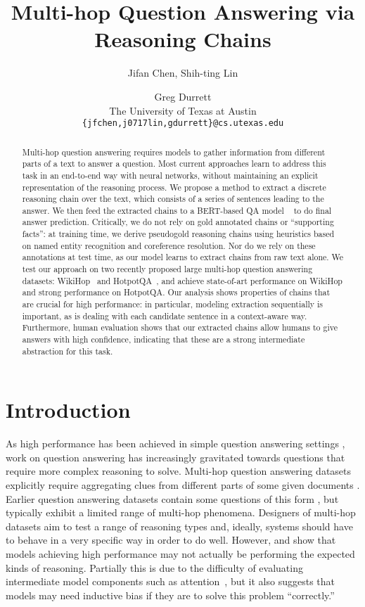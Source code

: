 \documentclass[11pt,a4paper]{article}
\title{Multi-hop Question Answering via \\  Reasoning Chains}
\author{Jifan Chen, Shih-ting Lin \and Greg Durrett \\
  The University of Texas at Austin \\
  {\tt \{jfchen,j0717lin,gdurrett\}@cs.utexas.edu}}
\date{}
\begin{document}
\maketitle
\begin{abstract}
Multi-hop question answering requires models to gather information from different parts of a text to answer a question. Most current approaches learn to address this task in an end-to-end way with neural networks, without maintaining an explicit representation of the reasoning process. We propose a method to extract a discrete reasoning chain over the text, which consists of a series of sentences leading to the answer. We then feed the extracted chains to a BERT-based QA model ~\citep{devlin2018bert} to do final answer prediction. Critically, we do not rely on gold annotated chains or ``supporting facts'': at training time, we derive pseudogold reasoning chains using heuristics based on named entity recognition and coreference resolution. Nor do we rely on these annotations at test time, as our model learns to extract chains from raw text alone.  We test our approach on two recently proposed large multi-hop question answering datasets: WikiHop~\citep{welbl2018constructing} and HotpotQA~\citep{yang2018hotpotqa}, and achieve state-of-art performance on WikiHop and strong performance on HotpotQA. Our analysis shows properties of chains that are crucial for high performance: in particular, modeling extraction sequentially is important, as is dealing with each candidate sentence in a context-aware way. Furthermore, human evaluation shows that our extracted chains allow humans to give answers with high confidence, indicating that these are a strong intermediate abstraction for this task.
\end{abstract}

\section{Introduction}

As high performance has been achieved in simple question answering settings \citep{rajpurkar2016squad}, work on question answering has increasingly gravitated towards questions that require more complex reasoning to solve. Multi-hop question answering datasets explicitly require aggregating clues from different parts of some given documents \citep{dua2019drop, welbl2018constructing, yang2018hotpotqa, jansen2018worldtree, khashabi2018looking}. Earlier question answering datasets contain some questions of this form \citep{richardson2013mctest,lai2017race}, but typically exhibit a limited range of multi-hop phenomena. Designers of multi-hop datasets aim to test a range of reasoning types \citep{yang2018hotpotqa} and, ideally, systems should have to behave in a very specific way in order to do well. However,  and  show that models achieving high performance may not actually be performing the expected kinds of reasoning. Partially this is due to the difficulty of evaluating intermediate model components such as attention~\citep{jain2019attention}, but it also suggests that models may need inductive bias if they are to solve this problem ``correctly.''
\end{document}
